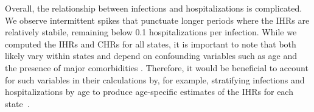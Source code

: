 Overall, the relationship between infections and hospitalizations is
complicated. We observe intermittent spikes that punctuate longer periods where
the IHRs are relatively stabile, remaining below 0.1 hospitalizations per
infection. While we computed the IHRs and CHRs for all states, it is
important to note that both likely vary within states and depend on confounding
variables such as age and the presence of major comorbidities
\citep{russell2023comorbidities}. Therefore, it would be beneficial to account
for such variables in their calculations by, for example, stratifying infections
and hospitalizations by age to produce age-specific estimates of the IHRs for
each state~\citep{fox2023disproportionate}.





